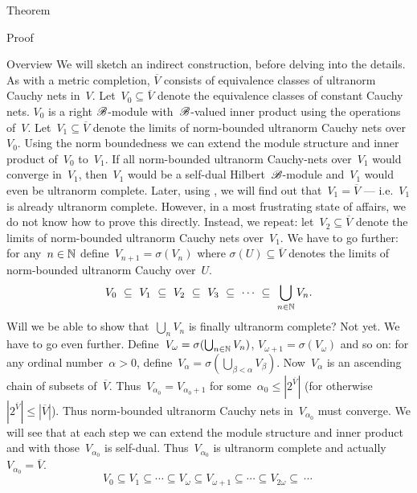 \documentclass[b]{subfiles}
\begin{document}
\begin{parsec}
\begin{point}{Theorem}
\begin{point}{Proof}
\begin{point}{Overview}
We will sketch an indirect construction,
    before delving into the details.
As with a metric completion,
    $\overline{V}$ consists of equivalence classes of ultranorm
        Cauchy nets in~$V$.
Let~$V_0\subseteq \overline{V}$
    denote the equivalence classes of constant Cauchy nets.
$V_0$ is a right $\mathscr{B}$-module with~$\mathscr{B}$-valued inner product
    using the operations of~$V$.
Let~$V_1\subseteq \overline{V}$ denote
    the limits of norm-bounded ultranorm Cauchy nets over~$V_0$.
Using the norm boundedness we can extend
    the module structure and inner product of~$V_0$ to~$V_1$.
If all norm-bounded ultranorm Cauchy-nets over~$V_1$ would
    converge in~$V_1$,
    then~$V_1$ would be a self-dual Hilbert~$\mathscr{B}$-module
    and~$V_1$ would even be ultranorm complete.
Later, using ,
    we will find out that~$V_1 = \overline{V}$ ---
    i.e.~$V_1$ is already ultranorm complete.
However, in a most frustrating state of affairs,
    we do not know how to prove this directly.
Instead, we repeat: let~$V_2 \subseteq \overline{V}$
    denote the limits of norm-bounded ultranorm Cauchy nets over~$V_1$.
We have to go further:
    for any~$n \in \mathbb{N}$
    define~$V_{n+1} = \sigma(V_n)$
    where $\sigma(U)\subseteq \overline{V}$
    denotes the limits of norm-bounded ultranorm Cauchy over~$U$.
\begin{equation*}
   V_0 \ \subseteq \ V_1 \ \subseteq\  V_2\  \subseteq\  V_3 \ \subseteq \ \cdots\ \subseteq \ \bigcup_{n \in \N} V_n.
\end{equation*}
Will we be able to show that~$\bigcup_n V_n$ is finally ultranorm complete?
Not yet.
We have to go even further.
Define~$V_\omega = \sigma(\bigcup_{n \in \mathbb{N}} V_n)$,
$V_{\omega+1} = \sigma(V_\omega)$
and so on:
for any ordinal number~$\alpha > 0$,
    define~$V_\alpha = \sigma(\bigcup_{\beta < \alpha} V_\beta)$.
Now~$V_\alpha$
    is an ascending chain of subsets of~$\overline{V}$.
    Thus~$V_{\alpha_0} = V_{{\alpha_0}+1}$
for some~$\alpha_0 \leq |2^{\overline{V}}|$
(for otherwise~$|2^{\overline{V}}| \leq |\overline{V}|$).
Thus norm-bounded ultranorm Cauchy nets in~$V_{\alpha_0}$
    must converge.
We will see that at each step we can extend the module structure
    and inner product and with those~$V_{\alpha_0}$ is self-dual.
    Thus~$V_{\alpha_0}$ is ultranorm complete
    and actually~$V_{\alpha_0} = \overline{V}$.
\begin{equation*}
   V_0 \subseteq V_1 \subseteq \cdots \subseteq V_\omega \subseteq
   V_{\omega+1} \subseteq \cdots \subseteq V_{2\omega} \subseteq
       \ \cdots\ 

\end{equation*}
\end{point}
\end{point}
\end{point}
\end{parsec}
\end{document}

